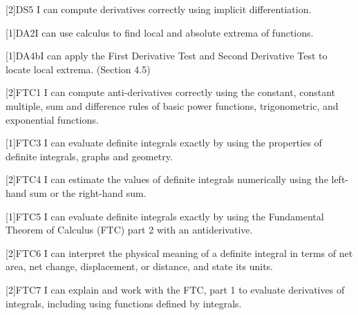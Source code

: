 

[2]{DS5}{%
I can compute derivatives correctly using implicit differentiation.
}




[1]{DA2}{I can use calculus to find local and absolute extrema of functions.}





[1]{DA4b}{I can apply the First Derivative Test and Second Derivative Test to locate local extrema.  (Section 4.5)}





[2]{FTC1}{%
I can compute anti-derivatives correctly using the constant, constant multiple, sum and difference rules of basic power functions, trigonometric, and exponential functions.
}


[1]{FTC3}{%
I can evaluate definite integrals exactly by using the properties of definite integrals, graphs and geometry.
}

[2]{FTC4}{%
I can estimate the values of definite integrals numerically using the left-hand sum or the right-hand sum.
}

[1]{FTC5}{%
I can evaluate definite integrals exactly by using the Fundamental Theorem of Calculus (FTC) part 2 with an antiderivative.
}

[2]{FTC6}{%
I can interpret the physical meaning of a definite integral in terms of net area, net change, displacement, or distance, and state its units.
}

[2]{FTC7}{%
I can explain and work with the FTC, part 1 to evaluate derivatives of integrals, including using functions defined by integrals.
}



\newcommand{\HWwarning}{{\large\color{red}\bfseries{} Warning: Your homework grade is
currently too low to pass the course with a grade of C.}\\[0.5em]}
